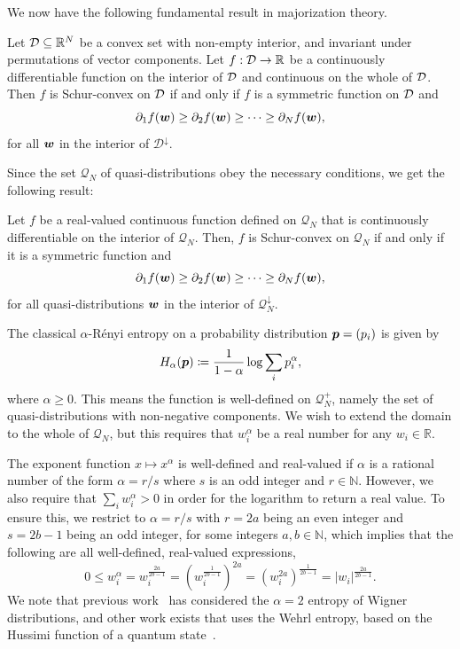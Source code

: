 \documentclass[pra,
aps,
twocolumn,
superscriptaddress,
groupedaddress,
nofootinbib,
reprint
]{revtex4-1}
\begin{document}
We now have the following fundamental result in majorization theory.
\begin{theorem} 
	Let ${\mathcal D}\subseteq \mathbb{R}^N$ be a convex set with non-empty interior, and invariant under permutations of vector components. Let $f: {\mathcal D} \rightarrow \mathbb{R}$ be a continuously differentiable function on the interior of ${\mathcal D}$ and continuous on the whole of ${\mathcal D}$. Then $f$ is Schur-convex on ${\mathcal D}$ if and only if $f$ is a symmetric function on ${\mathcal D}$ and 
\begin{equation}
	\partial_1 f(\boldsymbol{w}) \ge \partial_2 f(\boldsymbol{w}) \ge \cdots \ge \partial_N f(\boldsymbol{w}),
\end{equation}
for all $\boldsymbol{w}$ in the interior of $\mathcal{D}^\downarrow$.
\end{theorem}
Since the set $\mathcal{Q}_N$ of quasi-distributions obey the necessary conditions, we get the following result:
\begin{theorem}
	Let $f$ be a real-valued continuous function defined on $\mathcal{Q}_N$ that is continuously differentiable on the interior of $\mathcal{Q}_N$. 
Then, $f$ is Schur-convex on $\mathcal{Q}_N$ if and only if it is a symmetric function and
\begin{equation}
	\partial_1 f(\boldsymbol{w}) \ge \partial_2 f(\boldsymbol{w}) \ge \cdots \ge \partial_N f(\boldsymbol{w}),
\end{equation}
for all quasi-distributions $\boldsymbol{w}$ in the interior of $\mathcal{Q}^\downarrow_N$.
\end{theorem}


The classical $\alpha$-R\'{e}nyi entropy on a probability distribution $\boldsymbol{p} = (p_i)$ is given by
\begin{equation}
	H_\alpha(\boldsymbol{p}) \coloneqq \frac{1}{1-\alpha} \log \sum_i p_i^\alpha,
\end{equation}
where $\alpha \ge 0$. This means the function is well-defined on $\mathcal{Q}_N^+$, namely the set of quasi-distributions with non-negative components. We wish to extend the domain to the whole of $\mathcal{Q}_N$, but this requires that $w_i^\alpha$ be a real number for any $w_i \in \mathbb{R}$. 

The exponent function $x \mapsto x^\alpha$ is well-defined and real-valued if $\alpha$ is a rational number of the form $\alpha = r / s$ where $s$ is an odd integer and $r \in \mathbb{N}$. However, we also require that $\sum_i w_i^\alpha > 0$ in order for the logarithm to return a real value. To ensure this, we restrict to $\alpha = r/s$ with $r=2a$ being an even integer and $s=2b-1$ being an odd integer, for some integers $a,b\in  \mathbb{N}$, which implies that the following are all well-defined, real-valued expressions,
\begin{equation*}
	0 \le w_i^\alpha = w_i^{\frac{2a}{2b-1}} = \left (w_i^{\frac{1}{2b-1}}\right )^{2a} =\left (w_i^{2a}\right )^{\frac{1}{2b-1}} = |w_i|^{\frac{2a}{2b-1}}.
\end{equation*}
We note that previous work~\cite{Manfredi_2000} has considered the $\alpha=2$ entropy of Wigner distributions, and other work exists that uses the Wehrl entropy, based on the Hussimi function of a quantum state~\cite{Gnutzmann_2001}.
\end{document}
